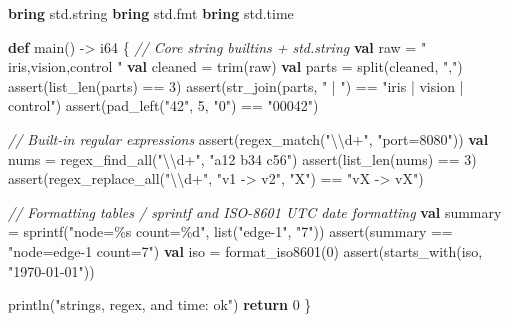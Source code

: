 \documentclass[
  english,
  oneside]{book}
\newenvironment{Shaded}{\begin{snugshade}}{\end{snugshade}}
\newcommand{\CommentTok}[1]{\textcolor[rgb]{0.42,0.60,0.33}{\textit{#1}}}
\newcommand{\ControlFlowTok}[1]{\textcolor[rgb]{0.77,0.53,0.75}{\textbf{#1}}}
\newcommand{\DataTypeTok}[1]{\textcolor[rgb]{0.31,0.79,0.69}{#1}}
\newcommand{\DecValTok}[1]{\textcolor[rgb]{0.71,0.81,0.66}{#1}}
\newcommand{\FunctionTok}[1]{\textcolor[rgb]{0.86,0.86,0.67}{#1}}
\newcommand{\KeywordTok}[1]{\textcolor[rgb]{0.34,0.61,0.84}{\textbf{#1}}}
\newcommand{\NormalTok}[1]{\textcolor[rgb]{0.83,0.83,0.83}{#1}}
\newcommand{\OperatorTok}[1]{\textcolor[rgb]{0.83,0.83,0.83}{#1}}
\newcommand{\StringTok}[1]{\textcolor[rgb]{0.81,0.57,0.47}{#1}}
\begin{document}
\begin{Shaded}
\begin{Highlighting}[]
\KeywordTok{bring}\NormalTok{ std}\OperatorTok{.}\NormalTok{string}
\KeywordTok{bring}\NormalTok{ std}\OperatorTok{.}\NormalTok{fmt}
\KeywordTok{bring}\NormalTok{ std}\OperatorTok{.}\NormalTok{time}

\KeywordTok{def}\NormalTok{ main() }\OperatorTok{{-}\textgreater{}} \DataTypeTok{i64}\NormalTok{ \{}
    \CommentTok{// Core string builtins + std.string}
    \KeywordTok{val}\NormalTok{ raw }\OperatorTok{=} \StringTok{"  iris,vision,control  "}
    \KeywordTok{val}\NormalTok{ cleaned }\OperatorTok{=} \FunctionTok{trim}\NormalTok{(raw)}
    \KeywordTok{val}\NormalTok{ parts }\OperatorTok{=} \FunctionTok{split}\NormalTok{(cleaned, }\StringTok{","}\NormalTok{)}
    \FunctionTok{assert}\NormalTok{(}\FunctionTok{list\_len}\NormalTok{(parts) }\OperatorTok{==} \DecValTok{3}\NormalTok{)}
    \FunctionTok{assert}\NormalTok{(str\_join(parts, }\StringTok{" | "}\NormalTok{) }\OperatorTok{==} \StringTok{"iris | vision | control"}\NormalTok{)}
    \FunctionTok{assert}\NormalTok{(pad\_left(}\StringTok{"42"}\NormalTok{, }\DecValTok{5}\NormalTok{, }\StringTok{"0"}\NormalTok{) }\OperatorTok{==} \StringTok{"00042"}\NormalTok{)}

    \CommentTok{// Built{-}in regular expressions}
    \FunctionTok{assert}\NormalTok{(}\FunctionTok{regex\_match}\NormalTok{(}\StringTok{"\textbackslash{}\textbackslash{}d+"}\NormalTok{, }\StringTok{"port=8080"}\NormalTok{))}
    \KeywordTok{val}\NormalTok{ nums }\OperatorTok{=} \FunctionTok{regex\_find\_all}\NormalTok{(}\StringTok{"\textbackslash{}\textbackslash{}d+"}\NormalTok{, }\StringTok{"a12 b34 c56"}\NormalTok{)}
    \FunctionTok{assert}\NormalTok{(}\FunctionTok{list\_len}\NormalTok{(nums) }\OperatorTok{==} \DecValTok{3}\NormalTok{)}
    \FunctionTok{assert}\NormalTok{(regex\_replace\_all(}\StringTok{"\textbackslash{}\textbackslash{}d+"}\NormalTok{, }\StringTok{"v1 {-}\textgreater{} v2"}\NormalTok{, }\StringTok{"X"}\NormalTok{) }\OperatorTok{==} \StringTok{"vX {-}\textgreater{} vX"}\NormalTok{)}

    \CommentTok{// Formatting tables / sprintf and ISO{-}8601 UTC date formatting}
    \KeywordTok{val}\NormalTok{ summary }\OperatorTok{=}\NormalTok{ sprintf(}\StringTok{"node=\%s count=\%d"}\NormalTok{, }\DataTypeTok{list}\NormalTok{(}\StringTok{"edge{-}1"}\NormalTok{, }\StringTok{"7"}\NormalTok{))}
    \FunctionTok{assert}\NormalTok{(summary }\OperatorTok{==} \StringTok{"node=edge{-}1 count=7"}\NormalTok{)}
    \KeywordTok{val}\NormalTok{ iso }\OperatorTok{=}\NormalTok{ format\_iso8601(}\DecValTok{0}\NormalTok{)}
    \FunctionTok{assert}\NormalTok{(}\FunctionTok{starts\_with}\NormalTok{(iso, }\StringTok{"1970{-}01{-}01"}\NormalTok{))}

\NormalTok{    println(}\StringTok{"strings, regex, and time: ok"}\NormalTok{)}
    \ControlFlowTok{return} \DecValTok{0}
\NormalTok{\}}
\end{Highlighting}
\end{Shaded}
\end{document}
